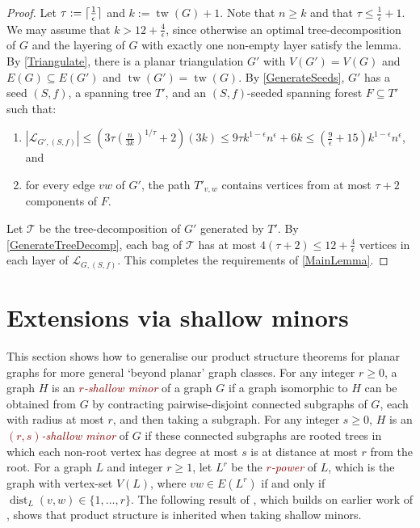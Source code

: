 \documentclass[11pt]{article}
\newcommand{\defn}[1]{\textcolor{Maroon}{\emph{#1}}}
\newcommand{\TT}{\mathcal{T}}
\DeclarePairedDelimiter{\ceil}{\lceil}{\rceil}
\renewcommand{\geq}{\geqslant}
\renewcommand{\leq}{\leqslant}
\DeclareMathOperator{\dist}{dist}
\DeclareMathOperator{\tw}{tw}
\theoremstyle{plain}
\theoremstyle{definition}
\begin{document}
		\begin{proof}%
			Let $\tau:=\ceil{\frac{1}{\epsilon}}$ and $k:=\tw(G)+1$. Note that $n\geq k$ and that $\tau\leq \frac{1}{\epsilon}+1$. 
			We may assume that $k> 12+\frac{4}{\epsilon}$, since otherwise an optimal tree-decomposition of $G$ and the layering of $G$ with exactly one non-empty layer satisfy the lemma.  
			By \cref{Triangulate}, there is a planar triangulation $G'$ with $V(G')=V(G)$ and $E(G)\subseteq E(G')$ and $\tw(G')=\tw(G)$. 
			By \cref{GenerateSeeds}, $G'$ has a seed $(S,f)$, 
			a spanning tree $T'$, and 
			an $(S,f)$-seeded spanning forest $F\subseteq T'$ such that:
			\begin{enumerate}
				\item $|\mathcal{L}_{G',(S,f)}|\leq 
				(3\tau(\frac{n}{3k})^{1/\tau}+2)(3k)
				\leq
				9\tau k^{1-\epsilon}n^\epsilon +6k
				\leq
				(\frac{9}{\epsilon}+15) k^{1-\epsilon}n^\epsilon 
				$, and
				\item for every edge $vw$ of $G'$, the path $T'_{v,w}$ contains vertices from at most $\tau+2$ components of $F$.
			\end{enumerate}
			
			Let $\TT$ be the tree-decomposition of $G'$ generated by $T'$. 
			By \cref{GenerateTreeDecomp}, each bag of $\TT$ has at most $4(\tau+2)\leq 12+\frac{4}{\epsilon}$ vertices in each layer of $\mathcal{L}_{G,(S,f)}$. This completes the requirements of \cref{MainLemma}.
		\end{proof}
		
		\section{Extensions via shallow minors}
        \label{sec:Extensions}

        This section shows how to generalise our product structure theorems for planar graphs for more general `beyond planar' graph classes. For any integer $r\geq 0$, a graph $H$ is an \defn{$r$-shallow minor} of a graph $G$ if a graph isomorphic to $H$ can be obtained from $G$ by contracting pairwise-disjoint connected subgraphs of $G$, each with radius at most $r$, and then taking a subgraph. 
        For any integer $s\geq 0$, $H$ is an \defn{$(r,s)$-shallow minor} of $G$ if these connected subgraphs are rooted trees in which each non-root vertex has degree at most $s$ is at distance at most $r$ from the root.
        For a graph $L$ and integer $r\geq 1$, let $L^r$ be the \defn{$r$-power} of $L$, which is the graph with vertex-set $V(L)$, where $vw\in E(L^r)$ if and only if $\dist_L(v,w)\in\{1,\dots,r\}$. The following result of \citet[Theorem~7]{HW24}, which builds on earlier work of \citet{DMW23}, shows that product structure is inherited when taking shallow minors. 
		
\end{document}
